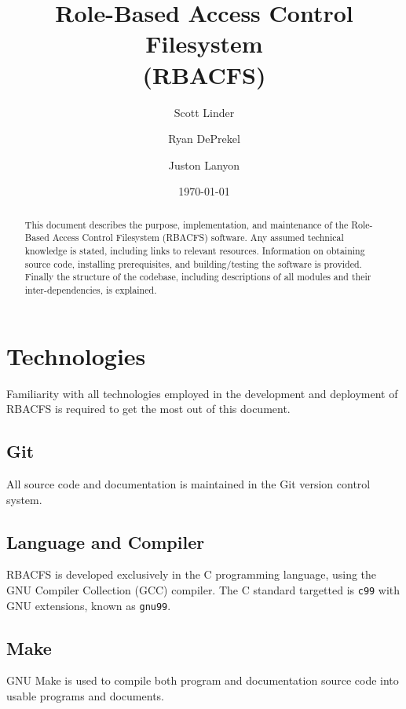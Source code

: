 \documentclass[11pt,oneside,letterpaper,twocolumn]{article}
\begin{document}
\title{
    Role-Based Access Control Filesystem\\
    (RBACFS)
}
\author{
    Scott Linder\\
    \and
    Ryan DePrekel\\
    \and
    Juston Lanyon
}
\date{\today}

\maketitle

\begin{abstract}
This document describes the purpose, implementation, and maintenance of the Role-Based Access Control Filesystem (RBACFS) software. Any assumed
technical knowledge is stated, including links to relevant resources.
Information on obtaining source code, installing prerequisites, and
building/testing the software is provided. Finally the structure of the
codebase, including descriptions of all modules and their inter-dependencies,
is explained.
\end{abstract}

\section{Technologies}

Familiarity with all technologies employed in the development and deployment of
RBACFS is required to get the most out of this document.

\subsection{Git}

All source code and documentation is maintained in the Git version control
system.

\subsection{Language and Compiler}

RBACFS is developed exclusively in the C programming language, using the GNU
Compiler Collection (GCC) compiler. The C standard targetted is {\tt c99} with
GNU extensions, known as {\tt gnu99}.

\subsection{Make}

GNU Make is used to compile both program and documentation source code into
usable programs and documents.
\end{document}
